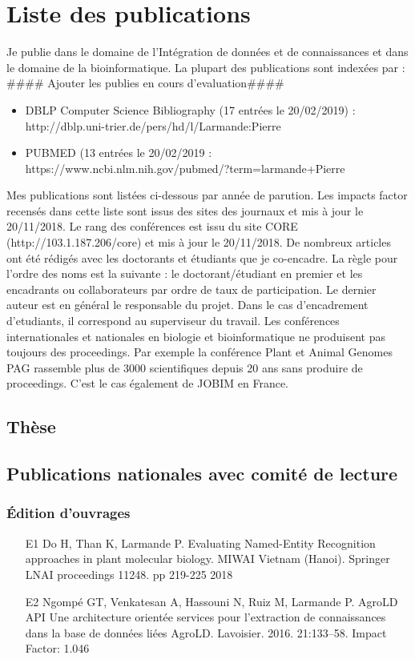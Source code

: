 \chapter{Liste des publications}
Je publie dans le domaine de l’Intégration de données et de connaissances et dans le domaine de la bioinformatique. La plupart des publications sont indexées par :
 #### Ajouter les publies en cours d'evaluation####
\begin{itemize}
\item DBLP Computer Science Bibliography (17 entrées le 20/02/2019) : \\
http://dblp.uni-trier.de/pers/hd/l/Larmande:Pierre
\item PUBMED (13 entrées le  20/02/2019 : \\
https://www.ncbi.nlm.nih.gov/pubmed/?term=larmande+Pierre 
\end{itemize}

\vspace{0.5cm}
Mes publications sont listées ci-dessous par année de parution. Les impacts factor recensés dans cette liste sont issus des sites des journaux et mis à jour le 20/11/2018. Le rang des conférences est issu du site CORE (http://103.1.187.206/core) et mis à jour le 20/11/2018.
De nombreux articles ont été rédigés avec les doctorants et étudiants que je co-encadre. La règle pour l’ordre des noms est la suivante : le doctorant/étudiant en premier et les encadrants ou collaborateurs par ordre de taux de participation. Le dernier auteur est en général le responsable du projet. Dans le cas d'encadrement d'etudiants, il correspond au superviseur du travail.
Les conférences internationales et nationales en biologie et bioinformatique ne produisent pas toujours des proceedings. Par exemple la conférence Plant et Animal Genomes PAG rassemble plus de 3000 scientifiques depuis 20 ans sans produire de proceedings. C’est le cas également de JOBIM en France. 

\section*{Thèse}

\section*{Publications nationales avec comité de lecture}
\subsection*{Édition d’ouvrages} 
\begin{itemize}
\item [E1] Do H, Than K, Larmande P. Evaluating Named-Entity Recognition approaches in plant molecular biology. MIWAI Vietnam (Hanoi). Springer LNAI  proceedings 11248. pp 219-225 2018
\item [E2]	Ngompé GT, Venkatesan A, Hassouni N, Ruiz M, Larmande P. AgroLD API Une architecture orientée services pour l’extraction de connaissances dans la base de données liées AgroLD. Lavoisier. 2016. 21:133–58. Impact Factor: 1.046
\end{itemize}

